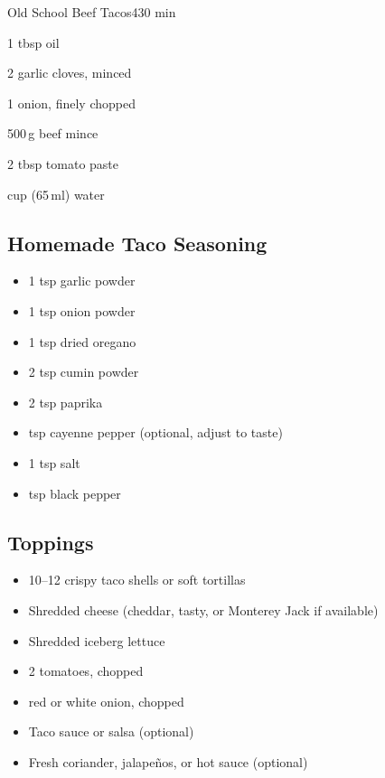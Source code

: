 \begin{recipebox}{Old School Beef Tacos}{4}{30 min}
\begin{ingredients}
  \item 1 tbsp oil
  \item 2 garlic cloves, minced
  \item 1 onion, finely chopped
  \item 500\,g beef mince
  \item 2 tbsp tomato paste
  \item {} cup (65\,ml) water
\end{ingredients}

\subsection*{Homemade Taco Seasoning}
\begin{itemize}[leftmargin=2em]
  \item 1 tsp garlic powder
  \item 1 tsp onion powder
  \item 1 tsp dried oregano
  \item 2 tsp cumin powder
  \item 2 tsp paprika
  \item {} tsp cayenne pepper (optional, adjust to taste)
  \item 1 tsp salt
  \item {} tsp black pepper
\end{itemize}

\subsection*{Toppings}
\begin{itemize}[leftmargin=2em]
  \item 10–12 crispy taco shells or soft tortillas
  \item Shredded cheese (cheddar, tasty, or Monterey Jack if available)
  \item Shredded iceberg lettuce
  \item 2 tomatoes, chopped
  \item {} red or white onion, chopped
  \item Taco sauce or salsa (optional)
  \item Fresh coriander, jalapeños, or hot sauce (optional)
\end{itemize}


\end{recipebox}
